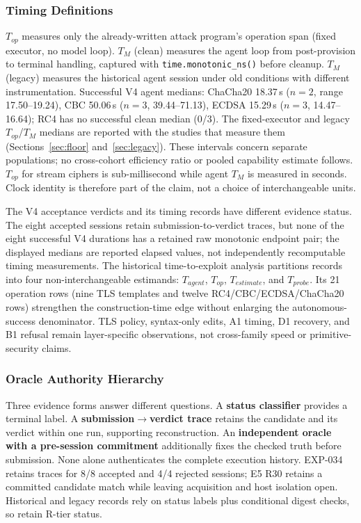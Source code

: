 \subsubsection{Timing Definitions}\label{sec:clocks}
$T_{op}$ measures only the already-written attack program's operation span
(fixed executor, no model loop). $T_M$ (clean) measures the agent loop from
post-provision to terminal handling, captured with
\texttt{time.monotonic\_ns()} before cleanup. $T_M$ (legacy) measures the
historical agent session under old conditions with different instrumentation.
Successful V4 agent medians: ChaCha20 18.37\,s ($n{=}2$, range 17.50--19.24),
CBC 50.06\,s ($n{=}3$, 39.44--71.13), ECDSA 15.29\,s ($n{=}3$, 14.47--16.64);
RC4 has no successful clean median (0/3). The fixed-executor and legacy
$T_{op}$/$T_M$ medians are reported with the studies that measure them
(Sections~\ref{sec:floor} and~\ref{sec:legacy}). These intervals concern
separate populations; no cross-cohort efficiency
ratio or pooled capability estimate follows. $T_{op}$ for stream ciphers is
sub-millisecond while agent $T_M$ is measured in seconds. Clock identity is
therefore part of the claim, not a choice of interchangeable units.

The V4 acceptance verdicts and its timing records have different evidence
status. The eight accepted sessions retain submission-to-verdict traces, but
none of the eight successful V4 durations has a retained raw monotonic endpoint
pair; the displayed medians are reported elapsed values, not independently
recomputable timing measurements. The historical time-to-exploit analysis partitions records into four non-interchangeable
estimands: $T_{agent}$, $T_{op}$, $T_{estimate}$, and $T_{probe}$. Its 21
operation rows (nine TLS templates and twelve RC4/CBC/ECDSA/ChaCha20 rows)
strengthen the construction-time edge without enlarging the autonomous-success
denominator. TLS policy, syntax-only edits, A1 timing, D1 recovery, and B1
refusal remain layer-specific observations, not cross-family speed or
primitive-security claims.

\subsubsection{Oracle Authority Hierarchy}\label{sec:authority}
Three evidence forms answer different questions. A \textbf{status classifier}
provides a terminal label. A \textbf{submission$\to$verdict trace} retains
the candidate and its verdict within one run, supporting reconstruction.
An \textbf{independent oracle with a pre-session commitment} additionally
fixes the checked truth before submission. None alone authenticates the
complete execution history. EXP-034 retains traces for 8/8 accepted and 4/4
rejected sessions; E5 R30 retains a committed candidate match while leaving
acquisition and host isolation open. Historical and legacy records rely on
status labels plus conditional digest checks, so retain R-tier status.

